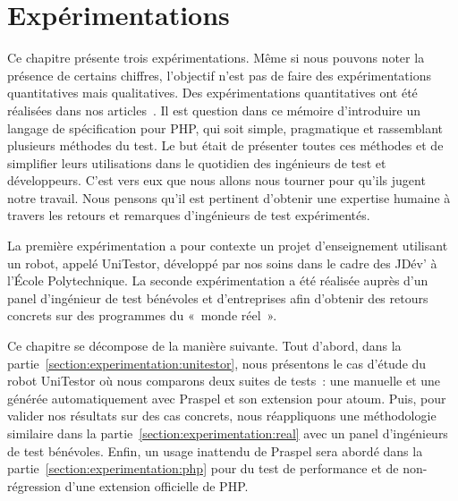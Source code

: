 \chapter{Expérimentations}
\label{chapter:experimentations}

\minitoc

Ce chapitre présente trois expérimentations. Même si nous pouvons noter la
présence de certains chiffres, l'objectif n'est pas de faire des
expérimentations {\strong quantitatives} mais {\strong qualitatives}. Des
expérimentations quantitatives ont été réalisées dans nos
articles~. Il est question
dans ce mémoire d'introduire un langage de spécification pour PHP, qui soit
simple, pragmatique et rassemblant plusieurs méthodes du test. Le but était de
présenter toutes ces méthodes et de simplifier leurs utilisations dans le
quotidien des ingénieurs de test et développeurs. C'est vers eux que nous allons
nous tourner pour qu'ils jugent notre travail. Nous pensons qu'il est pertinent
d'obtenir une expertise humaine à travers les retours et remarques d'ingénieurs
de test expérimentés.

La première expérimentation a pour contexte un projet d'enseignement utilisant
un robot, appelé UniTestor, développé par nos soins dans le cadre des JDév' à
l'École Polytechnique. La seconde expérimentation a été réalisée auprès d'un
panel d'ingénieur de test bénévoles et d'entreprises afin d'obtenir des retours
concrets sur des programmes du «~monde réel~».

Ce chapitre se décompose de la manière suivante. Tout d'abord, dans la
partie~\ref{section:experimentation:unitestor}, nous présentons le cas d'étude
du robot UniTestor où nous comparons deux suites de tests~: une manuelle et une
générée automatiquement avec Praspel et son extension pour atoum. Puis, pour
valider nos résultats sur des cas concrets, nous réappliquons une méthodologie
similaire dans la partie~\ref{section:experimentation:real} avec un panel
d'ingénieurs de test bénévoles. Enfin, un usage inattendu de Praspel sera abordé
dans la partie~\ref{section:experimentation:php} pour du test de performance et
de non-régression d'une extension officielle de PHP.

